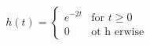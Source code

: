 \documentclass[preview]{standalone}
\begin{document}
\begin{align*}
h (t) = \begin{cases} e^{-2t} & \text{for } t \geq 0 \\ 0 & \text{ot h erwise} \end{cases}
\end{align*}
\end{document}
